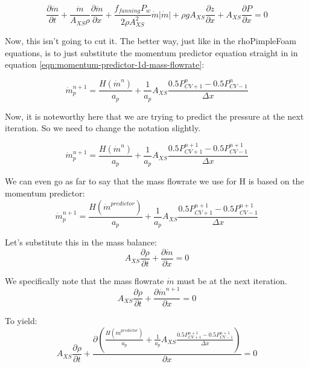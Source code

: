 \documentclass[masters]{ucbthesis}
\renewcommand{\_}{\kern-1.5pt\textunderscore\kern-1.5pt}
\begin{document}
\begin{equation*} 
	\frac{\partial \dot{m}}{\partial t}
	+ \frac{\dot{m}}{A_{XS} \rho} \frac{\partial \dot{m}}{\partial x} 
	+\frac{f_{fanning} P_w}{2 \rho A_{XS}^2} \dot{m} |\dot{m}|
	+ \rho g A_{XS} \frac{\partial z}{\partial x}
	+ A_{XS} \frac{\partial P}{\partial x} = 0
\end{equation*}

Now, this isn't going to cut it. The better way, just like in the 
rhoPimpleFoam equations, is to just substitute 
the momentum predictor equation straight in in 
equation \ref{eqn:momentum-predictor-1d-mass-flowrate}:

\begin{equation*} 
	\dot{m}_p^{n+1} = 
	\frac{H(\dot{m}^n)}{a_p} + 
	\frac{1}{a_p}
	A_{XS} \frac{0.5 P^{n}_{CV+1}-0.5P^n_{CV-1}}{\Delta x} 
\end{equation*}

Now, it is noteworthy here that we are trying to predict the pressure 
at the next iteration. So we need to change the notation slightly.

\begin{equation*} 
	\dot{m}_p^{n+1} = 
	\frac{H(\dot{m}^n)}{a_p} + 
	\frac{1}{a_p}
	A_{XS} \frac{0.5 P^{n+1}_{CV+1}-0.5P^{n+1}_{CV-1}}{\Delta x} 
\end{equation*}

We can even go as far to say that the mass flowrate we use for H is 
based on the momentum predictor:
\begin{equation*} 
	\dot{m}_p^{n+1} = 
	\frac{H(\dot{m}^{predictor})}{a_p} + 
	\frac{1}{a_p}
	A_{XS} \frac{0.5 P^{n+1}_{CV+1}-0.5P^{n+1}_{CV-1}}{\Delta x} 
\end{equation*}

Let's substitute this in the mass balance:
\begin{equation*}
	A_{XS} \frac{\partial \rho}{\partial t} 
	+ \frac{\partial \dot{m}}{\partial x} = 0
\end{equation*}

We specifically note that the mass flowrate $\dot{m}$ must be 
at the next iteration.
\begin{equation*}
	A_{XS} \frac{\partial \rho}{\partial t} 
	+ \frac{\partial \dot{m}^{n+1}}{\partial x} = 0
\end{equation*}

To yield:
\begin{equation*}
	A_{XS} \frac{\partial \rho}{\partial t} 
	+ \frac{ 
		\partial 
		\left(
			\frac{H(\dot{m}^{predictor})}{a_p} + 
			\frac{1}{a_p}
			A_{XS} \frac{0.5 P^{n+1}_{CV+1}-0.5P^{n+1}_{CV-1}}{\Delta x} 
		\right)
	}{\partial x} = 0
\end{equation*}
\end{document}
